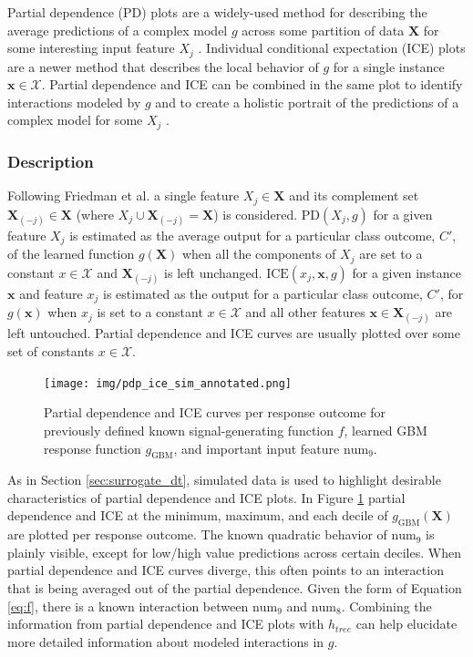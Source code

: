 \documentclass{article}
\begin{document}
Partial dependence (PD) plots are a widely-used method for describing the average predictions of a complex model $g$ across some partition of data $\mathbf{X}$ for some interesting input feature $X_j$ \cite{esl}. Individual conditional expectation (ICE) plots are a newer method that describes the local behavior of $g$ for a single instance $\mathbf{x} \in \mathcal{X}$. Partial dependence and ICE can be combined in the same plot to identify interactions modeled by $g$ and to create a holistic portrait of the predictions of a complex model for some $X_j$  \cite{ice_plots}.

\subsubsection{Description}
	
Following Friedman et al. a single feature $X_j \in \mathbf{X}$ and its complement set $\mathbf{X}_{(-j)} \in \mathbf{X}$ (where $X_j \cup \mathbf{X}_{(-j)} = \mathbf{X}$) is considered. $\text{PD}(X_j, g)$ for a given feature $X_j$ is estimated as the average output for a particular class outcome, $C'$, of the learned function $g(\mathbf{X})$ when all the components of $X_j$ are set to a constant $x \in \mathcal{X}$ and $\mathbf{X}_{(-j)}$ is left unchanged. $\text{ICE}(x_j, \mathbf{x}, g)$ for a given instance $\mathbf{x}$ and feature $x_j$ is estimated as the output for a particular class outcome, $C'$, for $g(\mathbf{x})$ when $x_j$ is set to a constant $x \in \mathcal{X}$ and all other features $\mathbf{x} \in \mathbf{X}_{(-j)}$ are left untouched. Partial dependence and ICE curves are usually plotted over some set of constants $x \in \mathcal{X}$. 

\begin{figure}[htb]
	\begin{center}
		\texttt{[image: img/pdp\_ice\_sim\_annotated.png]}
    \caption{Partial dependence and ICE curves per response outcome for previously defined known signal-generating function $f$,  learned GBM response function $g_{\text{GBM}}$, and important input feature $\text{num}_9$.}
    \label{fig:global_pdp_ice}
	\end{center}
\end{figure}

As in Section \ref{sec:surrogate_dt}, simulated data is used to highlight desirable characteristics of partial dependence and ICE plots. In Figure \ref{fig:global_pdp_ice} partial dependence and ICE at the minimum, maximum, and each decile of $g_{\text{GBM}}(\mathbf{X})$ are plotted per response outcome. The known quadratic behavior of $\text{num}_9$ is plainly visible, except for low/high value predictions across certain deciles. When partial dependence and ICE curves diverge, this often points to an interaction that is being averaged out of the partial dependence. Given the form of Equation \ref{eq:f}, there is a known interaction between $\text{num}_9$ and $\text{num}_8$. Combining the information from partial dependence and ICE plots with $h_{tree}$ can help elucidate more detailed information about modeled interactions in $g$.
\end{document}
